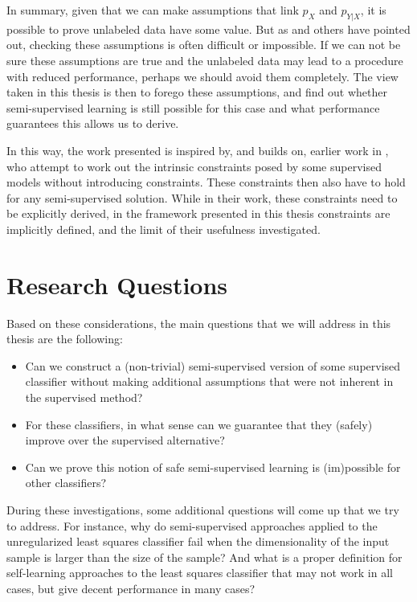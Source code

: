 \documentclass[twoside]{memoir}\usepackage[]{graphicx}\usepackage{xcolor}
\begin{document}
In summary, given that we can make assumptions that link $p_X$ and $p_{Y|X}$, it is possible to prove unlabeled data have some value. But as \citet{Ben-David2008} and others have pointed out, checking these assumptions is often difficult or impossible. If we can not be sure these assumptions are true and the unlabeled data may lead to a procedure with reduced performance, perhaps we should avoid them completely. The view taken in this thesis is then to forego these assumptions, and find out whether semi-supervised learning is still possible for this case and what performance guarantees this allows us to derive.

In this way, the work presented is inspired by, and builds on, earlier work in \citet{Loog2010,Loog2014b,Loog2014a}, who attempt to work out the intrinsic constraints posed by some supervised models without introducing constraints. These constraints then also have to hold for any semi-supervised solution. While in their work, these constraints need to be explicitly derived, in the framework presented in this thesis constraints are implicitly defined, and the limit of their usefulness investigated.

\section{Research Questions}
Based on these considerations, the main questions that we will address in this thesis are the following:
\begin{itemize}
\item Can we construct a (non-trivial) semi-supervised version of some supervised classifier without making additional assumptions that were not inherent in the supervised method?

\item For these classifiers, in what sense can we guarantee that they (safely) improve over the supervised alternative?

\item Can we prove this notion of safe semi-supervised learning is (im)possible for other classifiers?
\end{itemize}

During these investigations, some additional questions will come up that we try to address. For instance, why do semi-supervised approaches applied to the unregularized least squares classifier fail when the dimensionality of the input sample is larger than the size of the sample? And what is a proper definition for self-learning approaches to the least squares classifier that may not work in all cases, but give decent performance in many cases? 
\end{document}
